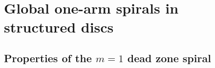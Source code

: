\section{Global one-arm spirals in structured discs}

\subsection{Properties of the $m=1$ dead zone spiral}


